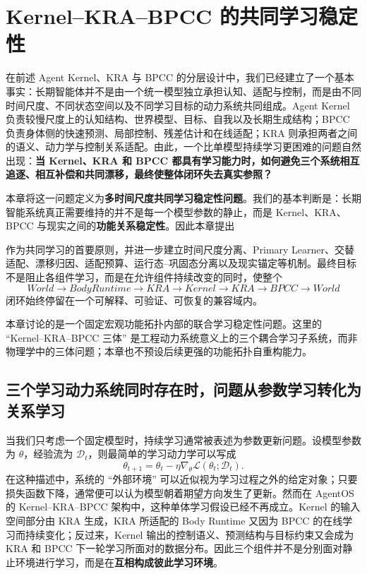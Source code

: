 \chapter{Kernel--KRA--BPCC 的共同学习稳定性}

\begin{chapterlead}
在前述 Agent Kernel、KRA 与 BPCC 的分层设计中，我们已经建立了一个基本事实：长期智能体并不是由一个统一模型独立承担认知、适配与控制，而是由不同时间尺度、不同状态空间以及不同学习目标的动力系统共同组成。Agent Kernel 负责较慢尺度上的认知结构、世界模型、目标、自我以及长期生成结构；BPCC 负责身体侧的快速预测、局部控制、残差估计和在线适配；KRA 则承担两者之间的语义、动力学与控制关系适配。由此，一个比单模型持续学习更困难的问题自然出现：\textbf{当 Kernel、KRA 和 BPCC 都具有学习能力时，如何避免三个系统相互追逐、相互补偿和共同漂移，最终使整体闭环失去真实参照？}

本章将这一问题定义为\textbf{多时间尺度共同学习稳定性问题}。我们的基本判断是：长期智能系统真正需要维持的并不是每一个模型参数的静止，而是 Kernel、KRA、BPCC 与现实之间的\textbf{功能关系稳定性}。因此本章提出
\begin{statementbox}
\centering
{}
\end{statementbox}
作为共同学习的首要原则，并进一步建立时间尺度分离、Primary Learner、交替适配、漂移归因、适配预算、运行态--巩固态分离以及现实锚定等机制。最终目标不是阻止各组件学习，而是在允许组件持续改变的同时，使整个
\[
World\rightarrow BodyRuntime\rightarrow KRA\rightarrow Kernel
\rightarrow KRA\rightarrow BPCC\rightarrow World
\]
闭环始终停留在一个可解释、可验证、可恢复的兼容域内。

本章讨论的是一个固定宏观功能拓扑内部的联合学习稳定性问题。这里的 ``Kernel--KRA--BPCC 三体'' 是工程动力系统意义上的三个耦合学习子系统，而非物理学中的三体问题；本章也不预设后续更强的功能拓扑自重构能力。
\end{chapterlead}


\section{三个学习动力系统同时存在时，问题从参数学习转化为关系学习}

当我们只考虑一个固定模型时，持续学习通常被表述为参数更新问题。设模型参数为 $\theta$，经验流为 $\mathcal{D}_t$，则最简单的学习动力学可以写成
\[
\theta_{t+1}
=
\theta_t
-
\eta \nabla_{\theta}\mathcal{L}
\left(
\theta_t;\mathcal{D}_t
\right).
\]
在这种描述中，系统的 ``外部环境'' 可以近似视为学习过程之外的给定对象；只要损失函数下降，通常便可以认为模型朝着期望方向发生了更新。然而在 AgentOS 的 Kernel--KRA--BPCC 架构中，这种单体学习假设已经不再成立。Kernel 的输入空间部分由 KRA 生成，KRA 所适配的 Body Runtime 又因为 BPCC 的在线学习而持续变化；反过来，Kernel 输出的控制语义、预测结构与目标约束又会成为 KRA 和 BPCC 下一轮学习所面对的数据分布。因此三个组件并不是分别面对静止环境进行学习，而是在\textbf{互相构成彼此学习环境}。

